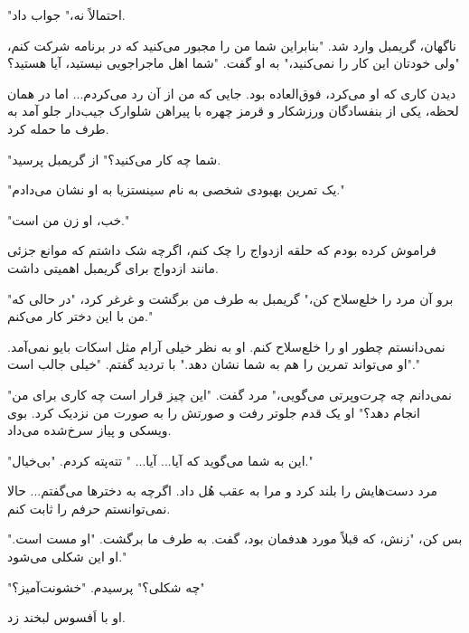 "احتمالاً نه،" جواب داد.

ناگهان، گریمبل وارد شد. "بنابراین شما من را مجبور می‌کنید که در برنامه شرکت کنم، ولی خودتان این کار را نمی‌کنید،" به او گفت. "شما اهل ماجراجویی نیستید، آیا هستید؟"

دیدن کاری که او می‌کرد، فوق‌العاده بود. جایی که من از آن رد می‌کردم... اما در همان لحظه، یکی از بنفسادگان ورزشکار و قرمز چهره با پیراهن شلوارک جیب‌دار جلو آمد به طرف ما حمله کرد. 

"شما چه کار می‌کنید؟" از گریمبل پرسید.

"یک تمرین بهبودی شخصی به نام سینستزیا به او نشان می‌دادم."

"خب، او زن من است."

فراموش کرده بودم که حلقه ازدواج را چک کنم، اگرچه شک داشتم که موانع جزئی مانند ازدواج برای گریمبل اهمیتی داشت.

"برو آن مرد را خلع‌سلاح کن،" گریمبل به طرف من برگشت و غرغر کرد، "در حالی که من با این دختر کار می‌کنم."

نمی‌دانستم چطور او را خلع‌سلاح کنم. او به نظر خیلی آرام مثل اسکات بایو نمی‌آمد. "او می‌تواند تمرین را هم به شما نشان دهد." با تردید گفتم. "خیلی جالب است."

"نمی‌دانم چه چرت‌و‌پرتی می‌گویی،" مرد گفت. "این چیز قرار است چه کاری برای من انجام دهد؟" او یک قدم جلوتر رفت و صورتش را به صورت من نزدیک کرد. بوی ویسکی و پیاز سرخ‌شده می‌داد.

"این به شما می‌گوید که آیا... آیا... " تته‌پته کردم. "بی‌خیال."

مرد دست‌هایش را بلند کرد و مرا به عقب هُل داد. اگرچه به دخترها می‌گفتم... حالا نمی‌توانستم حرفم را ثابت کنم.

"بس کن، "زنش، که قبلاً مورد هدفمان بود، گفت. به طرف ما برگشت. "او مست است. او این شکلی می‌شود."

"چه شکلی؟" پرسیدم. "خشونت‌آمیز؟"

او با اَفسوس لبخند زد.